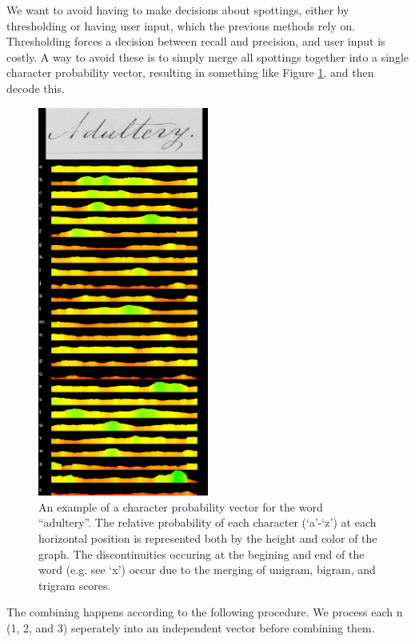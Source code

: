 \documentclass[ms,electronic,twosidetoc,letterpaper,chaptercenter,parttop,lol,lof,lot]{byumsphd}
\begin{document}
We want to avoid having to make decisions about spottings, either by thresholding or having user input, which the previous methods rely on. Thresholding forces a decision between recall and precision, and user input is costly. A way to avoid these is to simply merge all spottings together into a single character probability vector, resulting in something like Figure \ref{fig:cpv}, and then decode this.

\begin{figure}
    \centering
    \includegraphics[width=0.5\textwidth]{cpv}
    \caption{An example of a character probability vector for the word ``adultery''. The relative probability of each character (`a'-`z') at each horizontal position is represented both by the height and color of the graph. The discontinuities occuring at the begining and end of the word (e.g. see `x') occur due to the merging of unigram, bigram, and trigram scores.}
    \label{fig:cpv}
\end{figure}

The combining happens according to the following procedure.
We process each n (1, 2, and 3) seperately into an independent vector before combining them.
\end{document}
